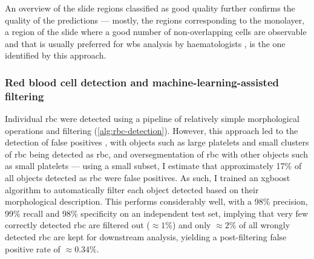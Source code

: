 \begin{figure}[!ht]
    \label{fig:slide-quality-examples}
\end{figure}

An overview of the slide regions classified as good quality further confirms the quality of the predictions  --- mostly, the regions corresponding to the monolayer, a region of the slide where a good number of non-overlapping cells are observable and that is usually preferred for \ac{wbs} analysis by haematologists \cite{Adewoyin2014-vo}, is the one identified by this approach.

\begin{figure}[!ht]
    \label{fig:slide-quality-regions}
\end{figure}

\subsubsection{Red blood cell detection and machine-learning-assisted filtering}

Individual \ac{rbc} were detected using a pipeline of relatively simple morphological operations and filtering (\ref{alg:rbc-detection}). However, this approach led to the detection of false positives , with objects such as large platelets and small clusters of \ac{rbc} being detected as \ac{rbc}, and oversegmentation of \ac{rbc} with other objects such as small platelets --- using a small subset, I estimate that approximately 17\% of all objects detected as \ac{rbc} were false positives. As such, I trained an \ac{xgboost} algorithm to automatically filter each object detected based on their morphological description. This performs considerably well, with a 98\% precision, 99\% recall and 98\% specificity on an independent test set, implying that very few correctly detected \ac{rbc} are filtered out ($\approx 1\%$) and only $\approx 2\%$ of all wrongly detected \ac{rbc} are kept for downstream analysis, yielding a post-filtering false positive rate of $\approx 0.34\%$. 

\begin{figure}[!ht]
    \label{fig:rbc-filter-examples}
\end{figure}

